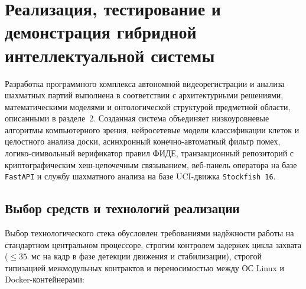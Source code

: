 \section{Реализация, тестирование и демонстрация гибридной интеллектуальной системы}

Разработка программного комплекса автономной видеорегистрации и анализа шахматных партий выполнена в соответствии с архитектурными решениями, математическими моделями и онтологической структурой предметной области, описанными в разделе~2. Созданная система объединяет низкоуровневые алгоритмы компьютерного зрения, нейросетевые модели классификации клеток и целостного анализа доски, асинхронный конечно-автоматный фильтр помех, логико-символьный верификатор правил ФИДЕ, транзакционный репозиторий с криптографическим хеш-цепочечным связыванием, веб-панель оператора на базе \texttt{FastAPI} и службу шахматного анализа на базе UCI-движка \texttt{Stockfish~16}.

\subsection{Выбор средств и технологий реализации}

Выбор технологического стека обусловлен требованиями надёжности работы на стандартном центральном процессоре, строгим контролем задержек цикла захвата ($\le 35$~мс на кадр в фазе детекции движения и стабилизации), строгой типизацией межмодульных контрактов и переносимостью между ОС Linux и Docker-контейнерами:

